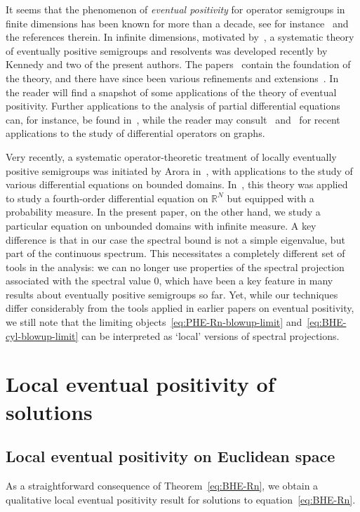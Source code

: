 \documentclass[a4paper, reqno]{amsart}
\numberwithin{equation}{section}
\theoremstyle{plain}
\theoremstyle{definition}
\theoremstyle{remark}
\newcommand{\RR}{\mathbb{R}}
\begin{document}
It seems that the phenomenon of \emph{eventual positivity} for operator semigroups in finite dimensions has been known for more than a decade, see for instance~\cite{NT} and the references therein. In infinite dimensions, motivated by~\cite{DD14}, a systematic theory of eventually positive semigroups and resolvents was developed recently by Kennedy and two of the present authors. The papers~\cite{DGK2, DGK1} contain the foundation of the theory, and there have since been various refinements and extensions~\cite{DG17, DG18, DG18-2, ArG20}.  In~\cite[Sections 7, 8]{AG20} the reader will find a snapshot of some applications of the theory of eventual positivity. Further applications to the analysis of partial differential equations can, for instance, be found in~\cite[Section 7]{DKP}, while the reader may consult~\cite[Section 6]{GM} and~\cite[Section 5]{BGM} for recent applications to the study of differential operators on graphs.

Very recently, a systematic operator-theoretic treatment of locally eventually positive semigroups was initiated by Arora in~\cite{Ar21}, with applications to the study of various differential equations on bounded domains. In~\cite{AGRT}, this theory was applied to study a fourth-order differential equation on $\RR^N$ but equipped with a probability measure. In the present paper, on the other hand, we study a particular equation on unbounded domains with infinite measure. A key difference is that in our case the spectral bound is not a simple eigenvalue, but part of the continuous spectrum. This necessitates a completely different set of tools in the analysis: we can no longer use properties of the spectral projection associated with the spectral value $0$, which have been a key feature in many results about eventually positive semigroups so far. Yet, while our techniques differ considerably from the tools applied in earlier papers on eventual positivity, we still note that the limiting objects~\eqref{eq:PHE-Rn-blowup-limit} and~\eqref{eq:BHE-cyl-blowup-limit} can be interpreted as `local' versions of spectral projections.

\section{Local eventual positivity of solutions}
\label{sec:LEP}

\subsection{Local eventual positivity on Euclidean space}
As a straightforward consequence of Theorem~\ref{eq:BHE-Rn}, we obtain a qualitative local eventual positivity result for solutions to equation~\eqref{eq:BHE-Rn}.
\end{document}
